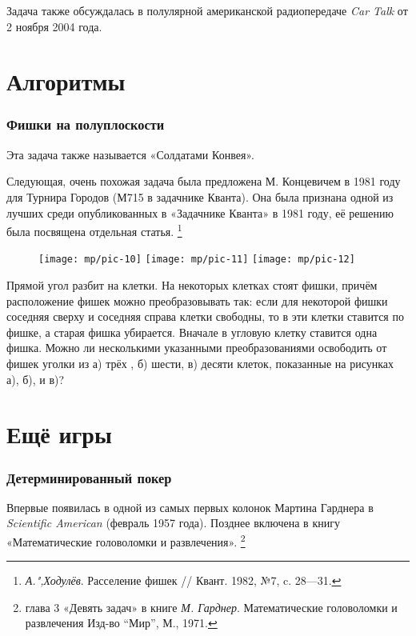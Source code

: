 \documentclass[twoside]{book}
\begin{document}
Задача также обсуждалась в полулярной американской радиопередаче \emph{Car Talk} от 2 ноября 2004 года.

\section{Алгоритмы}

\subsubsection{Фишки на полуплоскости}
Эта задача также называется «Солдатами Конвея».

Следующая, очень похожая задача была предложена М. Концевичем в 1981 году для Турнира Городов (М715 в задачнике Кванта).
Она была признана одной из лучших среди опубликованных в «Задачнике Кванта» в 1981 году,
её решению была посвящена отдельная статья.
\footnote{\emph{А.",Ходулёв}. Расселение фишек /\!/ Квант. 1982, №7, c. 28---31.}

\begin{figure}[!ht]
\centering
\texttt{[image: mp/pic-10]} %
\hskip7mm
\texttt{[image: mp/pic-11]}
\hskip7mm
\texttt{[image: mp/pic-12]}
\end{figure}

Прямой угол разбит на клетки.
На некоторых клетках стоят фишки, причём расположение фишек можно преобразовывать так: если для некоторой фишки соседняя сверху и соседняя справа клетки свободны, то в эти клетки ставится по фишке, а старая фишка убирается.
Вначале в угловую клетку ставится одна фишка.
Можно ли несколькими указанными преобразованиями освободить от фишек уголки из 
а) трёх , 
б) шести, 
в) десяти клеток,
показанные на рисунках а), б), и в)?


\section{Ещё игры}

\subsubsection{Детерминированный покер}
Впервые появилась в одной из самых первых колонок Мартина Гарднера в \emph{Scientific American} (февраль 1957 года).
Позднее включена в книгу «Математические головоломки и развлечения».%
\footnote{глава 3 «Девять задач» в книге \emph{М. Гарднер}.  Математические головоломки и развлечения Изд-во ``Мир'', М., 1971.}
\end{document}
